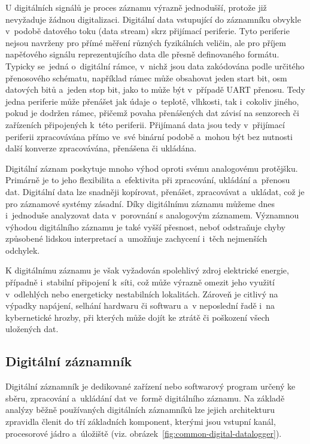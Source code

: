 U digitálních signálů je proces záznamu výrazně jednodušší, protože již nevyžaduje žádnou digitalizaci. Digitální data vstupující do záznamníku obvykle v~podobě datového toku (data stream) skrz přijímací periferie. Tyto periferie nejsou navrženy pro přímé měření různých fyzikálních veličin, ale pro příjem napěťového signálu reprezentujícího data dle přesně definovaného formátu. Typicky se~jedná o~digitální rámce, v~nichž jsou data zakódována podle určitého přenosového schématu, například rámec může obsahovat jeden start bit, osm datových bitů a~jeden stop bit, jako to může být v~případě UART přenosu. Tedy jedna periferie může přenášet jak údaje o~teplotě, vlhkosti, tak i~cokoliv jiného, pokud je dodržen rámec, přičemž povaha přenášených dat závisí na senzorech či zařízeních připojených k~této periferii. Přijímaná data jsou tedy v~přijímací periferii zpracovávána přímo ve~své binární podobě a~mohou být bez nutnosti další konverze zpracovávána, přenášena či ukládána.~\cite{perny2008zarizeni_cas_znacky}

Digitální záznam poskytuje mnoho výhod oproti svému analogovému protějšku. Primárně je to jeho flexibilita a~efektivita při zpracování, ukládání a~přenosu dat. Digitální data lze snadněji kopírovat, přenášet, zpracovávat a~ukládat, což je pro záznamové systémy zásadní. Díky digitálnímu záznamu můžeme dnes i~jednoduše analyzovat data v~porovnání s analogovým záznamem.  Významnou výhodou digitálního záznamu je také vyšší přesnost, neboť odstraňuje chyby způsobené lidskou interpretací a~umožňuje zachycení i~těch nejmenších odchylek.~\cite{rcp_analog_vs_digital}

K digitálnímu záznamu je však vyžadován spolehlivý zdroj elektrické energie, případně i~stabilní připojení k~síti, což může výrazně omezit jeho využití v~odlehlých nebo energeticky nestabilních lokalitách. Zároveň je citlivý na výpadky napájení, selhání hardwaru či softwaru a~v neposlední řadě i~na kybernetické hrozby, při kterých může dojít ke ztrátě či poškození všech uložených dat.~\cite{rcp_analog_vs_digital}

\subsection{Digitální záznamník}
\label{digitalni_zaznamik}
Digitální záznamník je dedikované zařízení nebo softwarový program určený ke sběru, zpracování a~ukládání dat ve~formě digitálního záznamu. Na základě analýzy běžně používaných digitálních záznamníků lze jejich architekturu zpravidla členit do tří základních komponent, kterými jsou vstupní kanál, procesorové jádro a~úložiště (viz. obrázek~\ref{fig:common-digital-datalogger}).~\cite{researchgate_general_dataloggger_multiple_sdcards, ieee_digital_sound_recorder_arm_sd_card, ieee_multi_connectivity_datalogger_sd_card}

